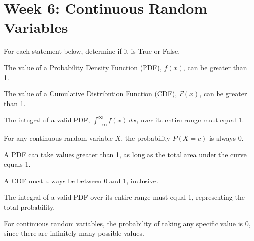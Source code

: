 \documentclass[a4paper, 10pt]{article}
\begin{document}
\subject[2110205 - Statistics for Computer Engineering]

\section{Week 6: Continuous Random Variables}



\begin{problem}
For each statement below, determine if it is True or False.
\begin{subproblems}
    \item The value of a Probability Density Function (PDF), \( f(x) \), can be greater than 1.
    \item The value of a Cumulative Distribution Function (CDF), \( F(x) \), can be greater than 1.
    \item The integral of a valid PDF, \( \int_{-\infty}^{\infty} f(x)\,dx \), over its entire range must equal 1.
    \item For any continuous random variable \( X \), the probability \( P(X = c) \) is always 0.
\end{subproblems}
\end{problem}

\begin{solution}
\begin{subproblems}
    \item {} A PDF can take values greater than 1, as long as the total area under the curve equals 1.
    \item {} A CDF must always be between 0 and 1, inclusive.
    \item {} The integral of a valid PDF over its entire range must equal 1, representing the total probability.
    \item {} For continuous random variables, the probability of taking any specific value is 0, since there are infinitely many possible values.
\end{subproblems}
\end{solution}
\end{document}
